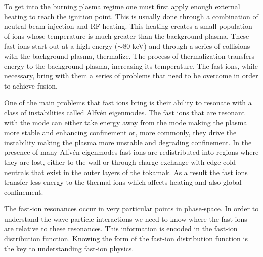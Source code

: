 To get into the burning plasma regime one must first apply enough external heating to reach the ignition point. This is usually done through a combination of neutral beam injection and RF heating. This heating creates a small population of ions whose temperature is much greater than the background plasma. These fast ions start out at a high energy ($\sim 80$ keV) and through a series of collisions with the background plasma, thermalize. The process of thermalization transfers energy to the background plasma, increasing its temperature. The fast ions, while necessary, bring with them a series of problems that need to be overcome in order to achieve fusion.

One of the main problems that fast ions bring is their ability to resonate with a class of instabilities called Alfv\'en eigenmodes\cite{heidbrink2008basic}. The fast ions that are resonant with the mode can either take energy away from the mode making the plasma more stable and enhancing confinement or, more commonly, they drive the instability making the plasma more unstable and degrading confinement. In the presence of many Alfv\'en eigenmodes fast ions are redistributed into regions where they are lost, either to the wall or through charge exchange with edge cold neutrals that exist in the outer layers of the tokamak. As a result the fast ions transfer less energy to the thermal ions which affects heating and also global confinement.\cite{heidbrink2014confinement,holcomb2015fast}

The fast-ion resonances occur in very particular points in phase-space. In order to understand the wave-particle interactions we need to know where the fast ions are relative to these resonances. This information is encoded in the fast-ion distribution function. Knowing the form of the fast-ion distribution function is the key to understanding fast-ion physics.

